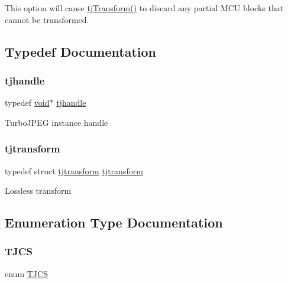 This option will cause \hyperlink{group___turbo_j_p_e_g_gae403193ceb4aafb7e0f56ab587b48616}{tj\+Transform()} to discard any partial M\+CU blocks that cannot be transformed. 

\subsection{Typedef Documentation}
\mbox{\label{group___turbo_j_p_e_g_ga758d2634ecb4949de7815cba621f5763}} 
\subsubsection{\texorpdfstring{tjhandle}{tjhandle}}
{\footnotesize\ttfamily typedef \hyperlink{png_8h_ac9c84fa68bbad002983e35ce3663c686}{void}$\ast$ \hyperlink{group___turbo_j_p_e_g_ga758d2634ecb4949de7815cba621f5763}{tjhandle}}

Turbo\+J\+P\+EG instance handle \mbox{\label{group___turbo_j_p_e_g_gaa29f3189c41be12ec5dee7caec318a31}} 
\subsubsection{\texorpdfstring{tjtransform}{tjtransform}}
{\footnotesize\ttfamily typedef struct \hyperlink{structtjtransform}{tjtransform}  \hyperlink{structtjtransform}{tjtransform}}

Lossless transform 

\subsection{Enumeration Type Documentation}
\mbox{\label{group___turbo_j_p_e_g_ga4f83ad3368e0e29d1957be0efa7c3720}} 
\subsubsection{\texorpdfstring{T\+J\+CS}{TJCS}}
{\footnotesize\ttfamily enum \hyperlink{group___turbo_j_p_e_g_ga4f83ad3368e0e29d1957be0efa7c3720}{T\+J\+CS}}

